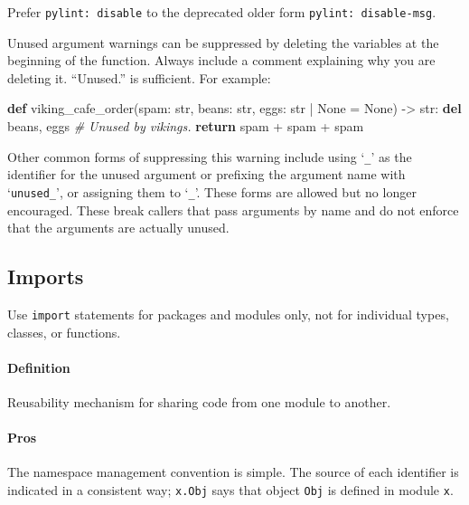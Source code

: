 \documentclass[
]{article}
\newenvironment{Shaded}{}{}
\newcommand{\BuiltInTok}[1]{\textcolor[rgb]{0.00,0.50,0.00}{#1}}
\newcommand{\CommentTok}[1]{\textcolor[rgb]{0.38,0.63,0.69}{\textit{#1}}}
\newcommand{\ControlFlowTok}[1]{\textcolor[rgb]{0.00,0.44,0.13}{\textbf{#1}}}
\newcommand{\KeywordTok}[1]{\textcolor[rgb]{0.00,0.44,0.13}{\textbf{#1}}}
\newcommand{\NormalTok}[1]{#1}
\newcommand{\OperatorTok}[1]{\textcolor[rgb]{0.40,0.40,0.40}{#1}}
\newcommand{\VariableTok}[1]{\textcolor[rgb]{0.10,0.09,0.49}{#1}}
\begin{document}
Prefer \texttt{pylint:\ disable} to the deprecated older form
\texttt{pylint:\ disable-msg}.

Unused argument warnings can be suppressed by deleting the variables at
the beginning of the function. Always include a comment explaining why
you are deleting it. ``Unused.'' is sufficient. For example:

\begin{samepage}
\begin{Shaded}
\begin{Highlighting}[]
\KeywordTok{def}\NormalTok{ viking\_cafe\_order(spam: }\BuiltInTok{str}\NormalTok{, beans: }\BuiltInTok{str}\NormalTok{, eggs: }\BuiltInTok{str} \OperatorTok{|} \VariableTok{None} \OperatorTok{=} \VariableTok{None}\NormalTok{) }\OperatorTok{{-}\textgreater{}} \BuiltInTok{str}\NormalTok{:}
    \KeywordTok{del}\NormalTok{ beans, eggs  }\CommentTok{\# Unused by vikings.}
    \ControlFlowTok{return}\NormalTok{ spam }\OperatorTok{+}\NormalTok{ spam }\OperatorTok{+}\NormalTok{ spam}
\end{Highlighting}
\end{Shaded}
\end{samepage}

Other common forms of suppressing this warning include using
`\texttt{\_}' as the identifier for the unused argument or prefixing the
argument name with `\texttt{unused\_}', or assigning them to
`\texttt{\_}'. These forms are allowed but no longer encouraged. These
break callers that pass arguments by name and do not enforce that the
arguments are actually unused.

\subsection{Imports}

Use \texttt{import} statements for packages and modules only, not for
individual types, classes, or functions.

\paragraph{Definition}

Reusability mechanism for sharing code from one module to another.

\paragraph{Pros}

The namespace management convention is simple. The source of each
identifier is indicated in a consistent way; \texttt{x.Obj} says that
object \texttt{Obj} is defined in module \texttt{x}.
\end{document}
